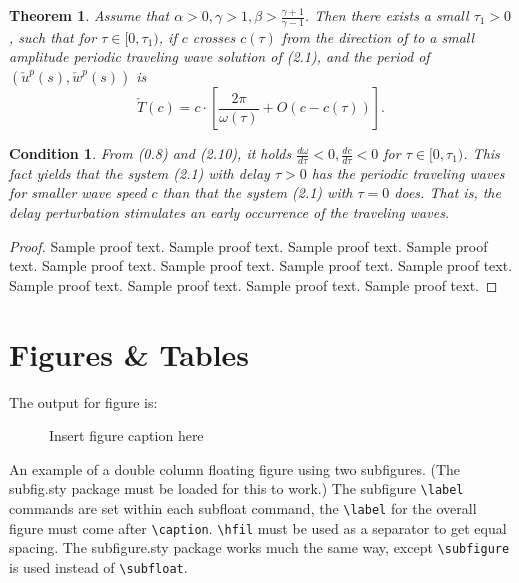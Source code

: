 \documentclass[preprint]{ptephy_v1}%
\newtheorem{theorem}{Theorem}
\newtheorem{condition}{Condition}
\begin{document}

\begin{theorem}\label{T0.1}
Assume that $\alpha>0, \gamma>1, \beta>\frac{\gamma+1}{\gamma-1}$.
Then there exists a small $\tau_1>0$, such that for $\tau\in
[0,\tau_1)$, if $c$ crosses $c(\tau)$ from the direction of
to  a small amplitude periodic traveling wave solution of
(2.1), and the period of $(\check{u}^p(s),\check{w}^p(s))$ is
\[
\check{T}(c)=c\cdot \left[\frac{2\pi}{\omega(\tau)}+O(c-c(\tau))\right].
\]
\end{theorem}


\begin{condition}\label{C2.2}
From (0.8) and (2.10), it holds
$\frac{d\omega}{d\tau}<0,\frac{dc}{d\tau}<0$ for $\tau\in
[0,\tau_1)$. This fact yields that the system (2.1) with delay
$\tau>0$ has the periodic traveling waves for smaller wave speed $c$
than that the system (2.1) with $\tau=0$ does. That is, the
delay perturbation stimulates an early occurrence of the traveling waves.
\end{condition}

\begin{proof}
Sample proof text. Sample proof text. Sample proof text. Sample proof text.
Sample proof text. Sample proof text. Sample proof text. Sample proof text.
Sample proof text. Sample proof text. Sample proof text. Sample proof text.
\end{proof}

\section{Figures \& Tables}

The output for figure is:

\begin{figure}[!h]
\caption{Insert figure caption here}
\label{fig_sim}
\end{figure}

 An example of a double column floating figure using two subfigures.
 (The subfig.sty package must be loaded for this to work.)
 The subfigure \verb+\label+ commands are set within each subfloat command, the
 \verb+\label+ for the overall figure must come after \verb+\caption+.
 \verb+\hfil+ must be used as a separator to get equal spacing.
 The subfigure.sty package works much the same way, except \verb+\subfigure+ is
 used instead of \verb+\subfloat+.
\end{document}

